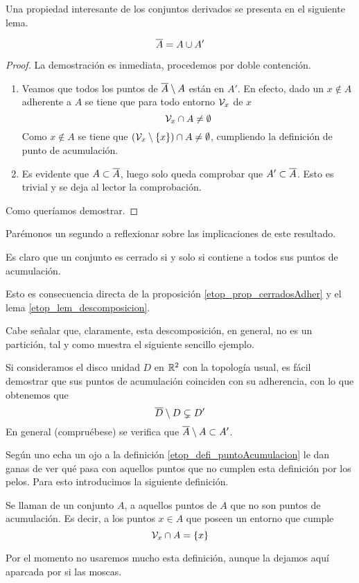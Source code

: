 Una propiedad interesante de los conjuntos derivados se presenta en el siguiente lema.
\begin{lem}
	\label{etop_lem_descomposicion}
	\begin{equation*}
	\overline{A}=A\cup A'
	\end{equation*}
\end{lem}
\begin{proof}
	La demostración es inmediata, procedemos por doble contención.
	\begin{enumerate}
		\item[\bsubset] Veamos que todos los puntos de $\overline{A}\setminus A$ están en $A'$. En efecto, dado un $x\not\in A$ adherente a $A$ se tiene que para todo entorno $\mathcal{V}_x$ de $x$
		\begin{equation*}
		\mathcal{V}_x\cap A\not=\emptyset
		\end{equation*}
		Como $x\not\in A$ se tiene que $(\mathcal{V}_x\setminus\{x\})\cap A\not=\emptyset$, cumpliendo la definición de punto de acumulación.
		\item[\bsupset] Es evidente que $A\subset\overline{A}$, luego solo queda comprobar que $A'\subset \overline{A}$. Esto es trivial y se deja al lector la comprobación.
	\end{enumerate}
	Como queríamos demostrar.
\end{proof}
Parémonos un segundo a reflexionar sobre las implicaciones de este resultado.
\begin{obs}
	Es claro que un conjunto es cerrado si y solo si contiene a todos sus puntos de acumulación.
	
	Esto es consecuencia directa de la proposición \ref{etop_prop_cerradosAdher} y el lema \ref{etop_lem_descomposicion}.
\end{obs}
Cabe señalar que, claramente, esta descomposición, en general, no es un partición, tal y como muestra el siguiente sencillo ejemplo.
\begin{exa}[Disco]
	Si consideramos el disco unidad $D$ en $\mathbb{R}^2$ con la topología usual, es fácil demostrar que sus puntos de acumulación coinciden con su adherencia, con lo que obtenemos que
	\begin{equation}
	\overline{D}\setminus D \subsetneq D'
	\end{equation}
	En general (compruébese) se verifica que $\overline{A}\setminus A\subset A'$.
\end{exa}
Según uno echa un ojo a la definición \ref{etop_defi_puntoAcumulacion} le dan ganas de ver qué pasa con aquellos puntos que no cumplen esta definición por los pelos. Para esto introducimos la siguiente definición.
\begin{defi}
	Se llaman  de un conjunto $A$, a aquellos puntos de $A$ que no son puntos de acumulación. Es decir, a los puntos $x\in A$ que poseen un entorno que cumple
	\begin{equation*}
	\mathcal{V}_x\cap A = \{x\}
	\end{equation*}
\end{defi}
Por el momento no usaremos mucho esta definición, aunque la dejamos aquí aparcada por si las moscas.

